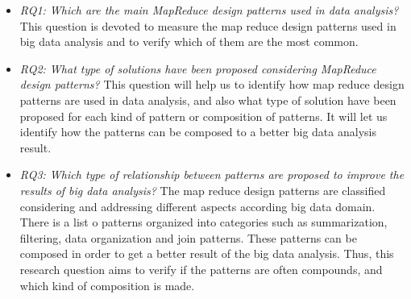 \begin{itemize}
\item {\em RQ1: Which are the main MapReduce design patterns used in data
analysis?} This question is devoted to measure the map reduce design patterns
used in big data analysis and to verify which of them are the most common.

\item {\em RQ2: What type of solutions have been proposed considering MapReduce
design patterns?} This question will help us to identify how map reduce design patterns are used in data analysis, and also
what type of solution have been proposed for each kind of pattern or
composition of patterns. It will let us identify how the patterns can be
composed to a better big data analysis result.
 
\item  {\em RQ3: Which type of relationship between patterns are proposed to
improve the results of big data analysis?} The map reduce design patterns are
classified considering and addressing different aspects
according big data domain. There is a list o patterns organized into categories
such as summarization, filtering, data organization and join patterns. These
patterns can be composed in order to get a better result of the big data
analysis. Thus, this research question aims to verify if the patterns are often
compounds, and which kind of composition is made.
 
\end{itemize} 

% 
%  
% 
% 

